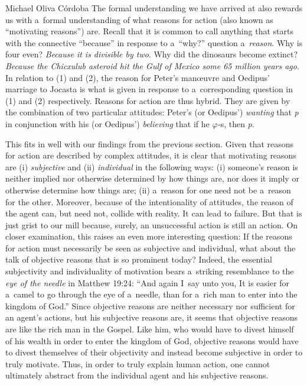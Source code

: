 \begin{artengenv}{Michael Oliva Córdoba}
The formal understanding we have arrived at also rewards us with a~formal understanding of what reasons for action (also known as ``motivating reasons'') are. Recall that it is common to call anything that starts with the connective ``because'' in response to a~``why?'' question a~\textit{reason}. Why is four even? \textit{Because it is divisible by two}. Why did the dinosaurs become extinct? \textit{Because the Chicxulub asteroid hit the Gulf of Mexico some 65 million years ago}. In relation to (1) and (2), the reason for Peter's manœuvre and Oedipus' marriage to Jocasta is what is given in response to a~corresponding question in (1) and (2) respectively. Reasons for action are thus hybrid. They are given by the combination of two particular attitudes: Peter's (or Oedipus') \textit{wanting} that \textit{p} in conjunction with his (or Oedipus') \textit{believing} that if he \textit{$\varphi $-}s, then \textit{p}.



This fits in well with our findings from the previous section. Given that reasons for action are described by complex attitudes, it is clear that motivating reasons are (i) \textit{subjective} and (ii) \textit{individual} in the following ways: (i) someone's reason is neither implied nor otherwise determined by how things are, nor does it imply or otherwise determine how things are; (ii) a~reason for one need not be a~reason for the other. Moreover, because of the intentionality of attitudes, the reason of the agent can, but need not, collide with reality. It can lead to failure. But that is just grist to our mill because, surely, an unsuccessful action is still an action. On closer examination, this raises an even more interesting question: If the reasons for action must necessarily be seen as subjective and individual, what about the talk of objective reasons that is so prominent today? Indeed, the essential subjectivity and individuality of motivation bears a~striking resemblance to the \textit{eye of the needle} in Matthew 19:24: ``And again I~say unto you, It is easier for a~camel to go through the eye of a~needle, than for a~rich man to enter into the kingdom of God.'' Since objective reasons are neither necessary nor sufficient for an agent's actions, but his subjective reasons are, it seems that objective reasons are like the rich man in the Gospel. Like him, who would have to divest himself of his wealth in order to enter the kingdom of God, objective reasons would have to divest themselves of their objectivity and instead become subjective in order to truly motivate. Thus, in order to truly explain human action, one cannot ultimately abstract from the individual agent and his subjective reasons.




\end{artengenv}
